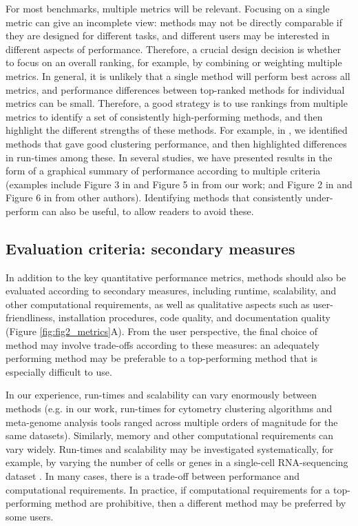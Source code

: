 For most benchmarks, multiple metrics will be relevant. Focusing on a single metric can give an incomplete view: methods may not be directly comparable if they are designed for different tasks, and different users may be interested in different aspects of performance. Therefore, a crucial design decision is whether to focus on an overall ranking, for example, by combining or weighting multiple metrics. In general, it is unlikely that a single method will perform best across all metrics, and performance differences between top-ranked methods for individual metrics can be small. Therefore, a good strategy is to use rankings from multiple metrics to identify a set of consistently high-performing methods, and then highlight the different strengths of these methods. For example, in \cite{weber_comparisonclusteringmethods_2016}, we identified methods that gave good clustering performance, and then highlighted differences in run-times among these. In several studies, we have presented results in the form of a graphical summary of performance according to multiple criteria (examples include Figure 3 in \cite{saelens_comparisonsinglecelltrajectory_2019} and Figure 5 in \cite{soneson_biasrobustnessscalability_2018} from our work; and Figure 2 in \cite{sage_quantitativeevaluationsoftware_2015} and Figure 6 in \cite{korthauer_practicalguidemethods_2019} from other authors). Identifying methods that consistently under-perform can also be useful, to allow readers to avoid these.

\subsection{Evaluation criteria: secondary measures}

In addition to the key quantitative performance metrics, methods should also be evaluated according to secondary measures, including runtime, scalability, and other computational requirements, as well as qualitative aspects such as user-friendliness, installation procedures, code quality, and documentation quality (Figure \ref{fig:fig2_metrics}A). From the user perspective, the final choice of method may involve trade-offs according to these measures: an adequately performing method may be preferable to a top-performing method that is especially difficult to use.

In our experience, run-times and scalability can vary enormously between methods (e.g. in our work, run-times for cytometry clustering algorithms \cite{weber_comparisonclusteringmethods_2016} and meta-genome analysis tools \cite{lindgreen_evaluationaccuracyspeed_2016} ranged across multiple orders of magnitude for the same datasets). Similarly, memory and other computational requirements can vary widely. Run-times and scalability may be investigated systematically, for example, by varying the number of cells or genes in a single-cell RNA-sequencing dataset \cite{duo_systematicperformanceevaluation_2018,soneson_biasrobustnessscalability_2018}. In many cases, there is a trade-off between performance and computational requirements. In practice, if computational requirements for a top-performing method are prohibitive, then a different method may be preferred by some users.

